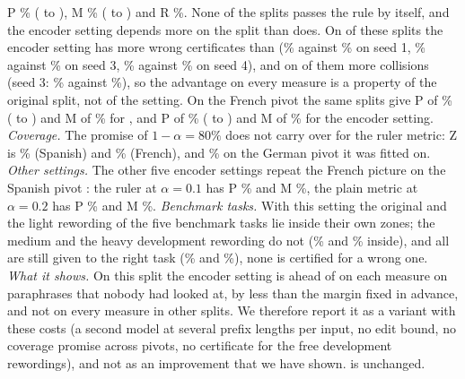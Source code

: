 \textsf{P} \WidenSplitEncPMean{}\% (\WidenSplitEncPLow{} to \WidenSplitEncPHigh{}), \textsf{M} \WidenSplitEncMMean{}\% (\WidenSplitEncMLow{} to \WidenSplitEncMHigh{}) and \textsf{R}
\WidenSplitEncRMean{}\%. None of the \WidenSplitCount{} splits passes the rule by itself, and the encoder setting depends more on the split than
\cert{} does. On \WidenSplitMoreM{} of these splits the encoder setting has more wrong certificates than \cert{} (\WidenSplitSeedOneEncM{}\% against \WidenSplitSeedOneRuleM{}\% on seed 1,
\WidenSplitSeedThreeEncM{}\% against \WidenSplitSeedThreeRuleM{}\% on seed 3, \WidenSplitSeedFourEncM{}\% against \WidenSplitSeedFourRuleM{}\% on seed 4), and on \WidenSplitMoreC{} of them more collisions (seed 3:
\WidenSplitSeedThreeEncC{}\% against \WidenSplitSeedThreeRuleC{}\%), so the advantage on every measure is a property of the original split, not of the setting. On the French pivot
the same splits give \textsf{P} of \WidenSplitFrRulePMean{}\% (\WidenSplitFrRulePLow{} to \WidenSplitFrRulePHigh{}) and \textsf{M} of \WidenSplitFrRuleMMean{}\% for \cert{}, and \textsf{P} of
\WidenSplitFrEncPMean{}\% (\WidenSplitFrEncPLow{} to \WidenSplitFrEncPHigh{}) and \textsf{M} of \WidenSplitFrEncMMean{}\% for the encoder setting. \emph{Coverage.} The promise of $1 - \alpha = 80\%$ does not carry over for the ruler metric: \textsf{Z} is \WidenSpEncEsZ{}\% (Spanish) and
\WidenSpEncFrZ{}\% (French), and \WidenSpEncDeZ{}\% on the German pivot it was fitted on. \emph{Other settings.} The other five encoder settings repeat the
French picture on the Spanish pivot : the ruler at $\alpha = 0.1$ has \textsf{P} \WidenSpAllRulerTenP{}\% and \textsf{M} \WidenSpAllRulerTenM{}\%, the plain metric at
$\alpha = 0.2$ has \textsf{P} \WidenSpAllPlainTwentyP{}\% and \textsf{M} \WidenSpAllPlainTwentyM{}\%. \emph{Benchmark tasks.} With this setting the original and the light rewording of
the five benchmark tasks lie inside their own zones; the medium and the heavy development rewording do not (\WidenSpBenchMediumZone{}\% and
\WidenSpBenchHeavyZone{}\% inside), and all are still given to the right task (\WidenSpBenchMediumRouted{}\% and \WidenSpBenchHeavyRouted{}\%), none is certified for a wrong one.
\emph{What it shows.} On this split the encoder setting is ahead of \cert{} on each measure on paraphrases that nobody had looked at, by less than the margin
fixed in advance, and not on every measure in other splits. We therefore report it as a variant with these costs (a second model at several prefix lengths per input, no edit bound, no coverage promise
across pivots, no certificate for the free development rewordings), and not as an improvement that we have shown. \cert{} is unchanged.

